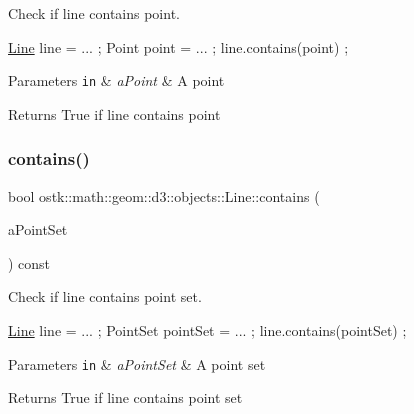 Check if line contains point. 


\begin{DoxyCode}
\hyperlink{classostk_1_1math_1_1geom_1_1d3_1_1objects_1_1_line_a9ebdaaf67a4bd91780808f8683463ebe}{Line} line = ... ;
Point point = ... ;
line.contains(point) ;
\end{DoxyCode}



\begin{DoxyParams}[1]{Parameters}
\mbox{\tt in}  & {\em a\+Point} & A point \\
\hline
\end{DoxyParams}
\begin{DoxyReturn}{Returns}
True if line contains point 
\end{DoxyReturn}
\mbox{\label{classostk_1_1math_1_1geom_1_1d3_1_1objects_1_1_line_a63fe1d825e847ba201c50ddf2d02ee1e}} 
\subsubsection{\texorpdfstring{contains()}{contains()}\hspace{0.1cm}{\footnotesize\ttfamily [2/2]}}
{\footnotesize\ttfamily bool ostk\+::math\+::geom\+::d3\+::objects\+::\+Line\+::contains (\begin{DoxyParamCaption}\item[{const \hyperlink{classostk_1_1math_1_1geom_1_1d3_1_1objects_1_1_point_set}{Point\+Set} \&}]{a\+Point\+Set }\end{DoxyParamCaption}) const}



Check if line contains point set. 


\begin{DoxyCode}
\hyperlink{classostk_1_1math_1_1geom_1_1d3_1_1objects_1_1_line_a9ebdaaf67a4bd91780808f8683463ebe}{Line} line = ... ;
PointSet pointSet = ... ;
line.contains(pointSet) ;
\end{DoxyCode}



\begin{DoxyParams}[1]{Parameters}
\mbox{\tt in}  & {\em a\+Point\+Set} & A point set \\
\hline
\end{DoxyParams}
\begin{DoxyReturn}{Returns}
True if line contains point set 
\end{DoxyReturn}
\mbox{\label{classostk_1_1math_1_1geom_1_1d3_1_1objects_1_1_line_acbc844b79bd79c92641828baefee8eb7}} 
